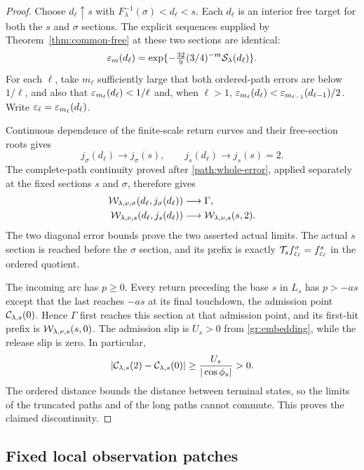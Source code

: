 \begin{proof}
Choose $d_\ell\uparrow s$ with
$F_\lambda^{-1}(\sigma)<d_\ell<s$. Each $d_\ell$ is an interior
free target for both the $s$ and $\sigma$ sections. The explicit
sequences supplied by Theorem~\ref{thm:common-free} at these two
sections are identical:
\[
 \varepsilon_m(d_\ell)=
 \exp\{-\tfrac{32}{9}(3/4)^{-m}\mathcal S_\lambda(d_\ell)\}.
\]
For each $\ell$, take $m_\ell$ sufficiently large that both
ordered-path errors are below $1/\ell$, and also that
$\varepsilon_{m_\ell}(d_\ell)<1/\ell$ and, when $\ell>1$,
$\varepsilon_{m_\ell}(d_\ell)<\varepsilon_{m_{\ell-1}}(d_{\ell-1})/2$.
Write $\varepsilon_\ell=\varepsilon_{m_\ell}(d_\ell)$.

Continuous dependence of the finite-scale return curves and their
free-section roots gives
\[
 j_\sigma(d_\ell)\longrightarrow j_\sigma(s),\qquad
 j_s(d_\ell)\longrightarrow j_s(s)=2.
\]
The complete-path continuity proved after
\eqref{path:whole-error}, applied separately at the fixed sections
$s$ and $\sigma$, therefore gives
\[
 \begin{split}
 \mathcal W_{\lambda,\nu,\sigma}(d_\ell,j_\sigma(d_\ell))
      &\longrightarrow\Gamma,\\
 \mathcal W_{\lambda,\nu,s}(d_\ell,j_s(d_\ell))
      &\longrightarrow\mathcal W_{\lambda,\nu,s}(s,2).
 \end{split}
\]
The two diagonal error bounds prove the two asserted actual limits.
The actual $s$ section is reached before the $\sigma$ section,
and its prefix is exactly
$\mathcal T_s f_{\varepsilon_\ell}^\sigma=f_{\varepsilon_\ell}^s$ in the
ordered quotient.

The incoming arc has $p\ge0$. Every return preceding the base $s$
in $L_s$ has $p>-as$ except that the last reaches $-as$ at its
final touchdown, the admission point $\mathcal C_{\lambda,s}(0)$.
Hence $\Gamma$ first reaches this section at that admission point,
and its first-hit prefix is $\mathcal W_{\lambda,\nu,s}(s,0)$.
The admission slip is $U_s>0$ from \eqref{gr:embedding}, while
the release slip is zero. In particular,
\[
 |\mathcal C_{\lambda,s}(2)-\mathcal C_{\lambda,s}(0)|
   \ge \frac{U_s}{|\cos\phi_s|}>0.
\]
The ordered distance bounds the distance between terminal states,
so the limits of the truncated paths and of the long paths cannot
commute. This proves the claimed discontinuity.
\end{proof}

\subsection{Fixed local observation patches}

